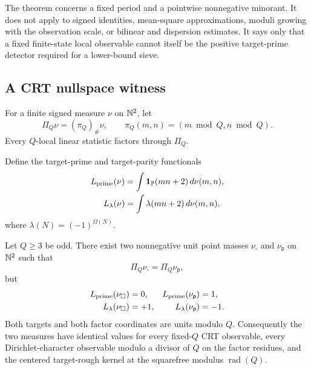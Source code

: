 \begin{remark}\label{rem:minorant-scope}
The theorem concerns a fixed period and a pointwise nonnegative minorant.  It
does not apply to signed identities, mean-square approximations, moduli
growing with the observation scale, or bilinear and dispersion estimates.
It says only that a fixed finite-state local observable cannot itself be the
positive target-prime detector required for a lower-bound sieve.
\end{remark}

\subsection{A CRT nullspace witness}

For a finite signed measure $\nu$ on $\mathbb N^2$, let
\begin{equation}\label{eq:crt-pushforward}
 \Pi_Q\nu=(\pi_Q)_\#\nu,
 \qquad
 \pi_Q(m,n)=(m\bmod Q,n\bmod Q).
\end{equation}
Every $Q$-local linear statistic factors through $\Pi_Q$.

Define the target-prime and target-parity functionals
\begin{align}
 L_{\rm prime}(\nu)
 &=\int\mathbf 1_{\mathbb P}(mn+2)\,d\nu(m,n),\label{eq:prime-functional}\\
 L_{\lambda}(\nu)
 &=\int\lambda(mn+2)\,d\nu(m,n),\label{eq:liouville-functional}
\end{align}
where $\lambda(N)=(-1)^{\Omega(N)}$.

\begin{theorem}\label{thm:fixed-crt-nonidentifiability}
Let $Q\ge3$ be odd.  There exist two nonnegative unit point masses
$\nu_\square$ and $\nu_{\mathsf p}$ on $\mathbb N^2$ such that
\begin{equation}\label{eq:same-crt-data}
 \Pi_Q\nu_\square=\Pi_Q\nu_{\mathsf p},
\end{equation}
but
\begin{align}
 L_{\rm prime}(\nu_\square)&=0,&
 L_{\rm prime}(\nu_{\mathsf p})&=1,
 \label{eq:prime-functional-separation}\\
 L_\lambda(\nu_\square)&=+1,&
 L_\lambda(\nu_{\mathsf p})&=-1.
 \label{eq:lambda-functional-separation}
\end{align}
Both targets and both factor coordinates are units modulo $Q$.
Consequently the two measures have identical values for every fixed-$Q$ CRT
observable, every Dirichlet-character observable modulo a divisor of $Q$ on
the factor residues, and the centered target-rough kernel at the squarefree
modulus $\operatorname{rad}(Q)$.
\end{theorem}

